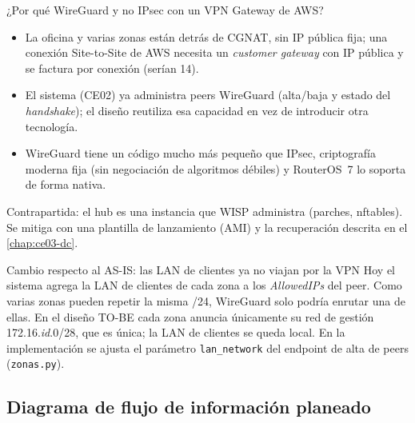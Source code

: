 \begin{upeubox}{¿Por qué WireGuard y no IPsec con un VPN Gateway de AWS?}
\begin{itemize}[leftmargin=1.2em]
  \item La oficina y varias zonas están detrás de CGNAT, sin IP pública fija; una
  conexión Site-to-Site de AWS necesita un \emph{customer gateway} con IP pública y se
  factura por conexión (serían 14).
  \item El sistema (CE02) ya administra peers WireGuard (alta/baja y estado del
  \emph{handshake}); el diseño reutiliza esa capacidad en vez de introducir otra
  tecnología.
  \item WireGuard tiene un código mucho más pequeño que IPsec, criptografía moderna
  fija (sin negociación de algoritmos débiles) y RouterOS~7 lo soporta de forma nativa.
\end{itemize}
Contrapartida: el hub es una instancia que WISP administra (parches, nftables). Se
mitiga con una plantilla de lanzamiento (AMI) y la recuperación descrita en el
\cref{chap:ce03-dc}.
\end{upeubox}

\begin{upeubox}{Cambio respecto al AS-IS: las LAN de clientes ya no viajan por la VPN}
Hoy el sistema agrega la LAN de clientes de cada zona a los \emph{AllowedIPs} del peer.
Como varias zonas pueden repetir la misma /24, WireGuard solo podría enrutar una de
ellas. En el diseño TO-BE cada zona anuncia únicamente su red de gestión
172.16.\textit{id}.0/28, que es única; la LAN de clientes se queda local. En la
implementación se ajusta el parámetro \texttt{lan\_network} del endpoint de alta de
peers (\texttt{zonas.py}).
\end{upeubox}

\subsection{Diagrama de flujo de información planeado}

